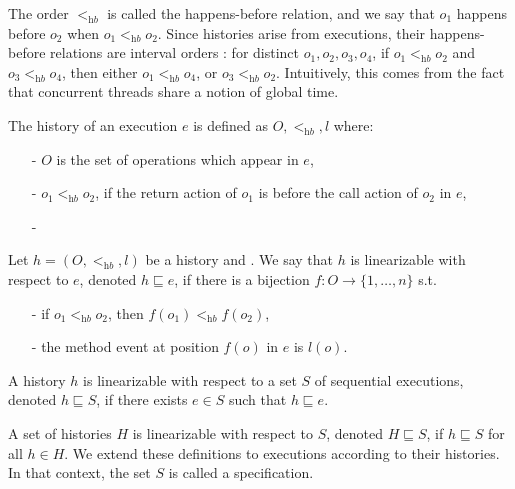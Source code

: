 The order $<_{\textit{hb}}$ is called the happens-before relation, and we say that $o_1$ happens before $o_2$ when $o_1 <_{\textit{hb}} o_2$. Since histories arise from executions, their happens-before relations are interval orders \cite{Bouajjani:2015POPL}: for distinct $o_1,o_2,o_3,o_4$, if $o_1 <_{\textit{hb}} o_2$ and $o_3 <_{\textit{hb}} o_4$, then either $o_1 <_{\textit{hb}} o_4$, or $o_3 <_{\textit{hb}} o_2$. Intuitively, this comes from the fact that concurrent threads share a notion of global time.

The history of an execution $e$ is defined as $O,<_{\textit{hb}},l$ where:

\begin{itemize}
\setlength{\itemsep}{0.5pt}
\item[-] $O$ is the set of operations which appear in $e$,

\item[-] $o_1 <_{\textit{hb}} o_2$, if the return action of $o_1$ is before the call action of $o_2$ in $e$,

\item[-] 
\end{itemize}

\begin{example}\label{example:concurrent execution}
\end{example}

Let $h = (O,<_{\textit{hb}},l)$ be a history and . We say that $h$ is linearizable with respect to $e$, denoted $h \sqsubseteq e$, if there is a bijection $f: O \rightarrow \{ 1,\ldots,n \}$ s.t.

\begin{itemize}
\setlength{\itemsep}{0.5pt}
\item[-] if $o_1 <_{\textit{hb}} o_2$, then $f(o_1) <_{\textit{hb}} f(o_2)$,

\item[-] the method event at position $f(o)$ in $e$ is $l(o)$.
\end{itemize}

\begin{definition}\label{def:linearizability}
A history $h$ is linearizable with respect to a set $S$ of sequential executions, denoted $h \sqsubseteq S$, if there exists $e \in S$ such that $h \sqsubseteq e$.
\end{definition}

A set of histories $H$ is linearizable with respect to $S$, denoted $H \sqsubseteq S$, if $h \sqsubseteq S$ for all $h \in H$. We extend these definitions to executions according to their histories. In that context, the set $S$ is called a specification.